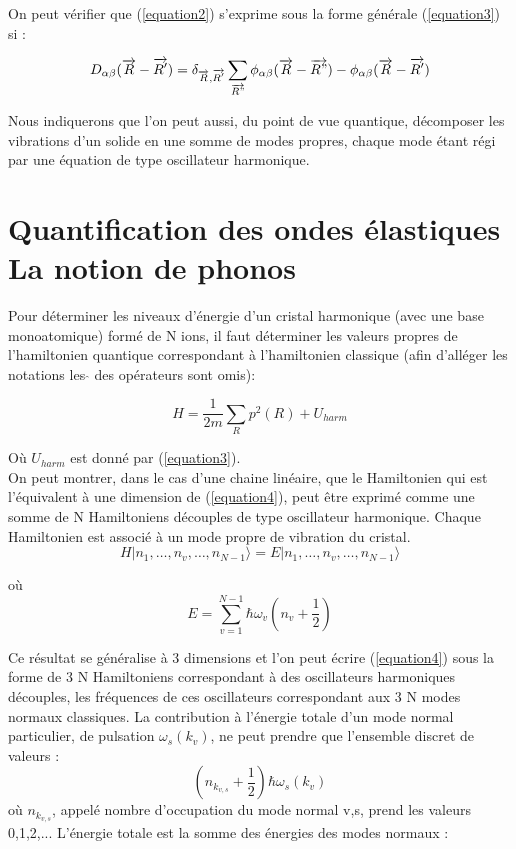 \documentclass[12pt,a4paper]{book}
\begin{document}
On peut vérifier que (\ref{equation2}) s'exprime sous la forme générale (\ref{equation3}) si :

\begin{equation}
D_{\alpha\beta} (\overrightarrow{R}-\overrightarrow{R'}) = \delta_{\overrightarrow{R},\overrightarrow{R'}} \sum_{\overrightarrow{R"}} \phi_{\alpha\beta} (\overrightarrow{R}-\overrightarrow{R"}) - \phi_{\alpha\beta} (\overrightarrow{R}-\overrightarrow{R'})
\end{equation}

Nous indiquerons que l'on peut aussi, du point de vue quantique, décomposer les vibrations d'un solide en une somme de modes propres, chaque mode étant régi par une équation de type oscillateur harmonique.

\section{Quantification des ondes élastiques La notion de phonos}

Pour déterminer les niveaux d'énergie d'un cristal harmonique (avec une base monoatomique) formé de N ions, il faut déterminer les valeurs propres de l'hamiltonien quantique correspondant à l'hamiltonien classique (afin d'alléger les notations les $\hat{}$ des opérateurs sont omis):

\begin{equation}
H = \frac{1}{2m} \sum_{R} p^{2}(R) + U_{harm} \label{equation4}
\end{equation}

Où $U_{harm}$ est donné par (\ref{equation3}).
\\

On peut montrer, dans le cas d'une chaine linéaire, que le Hamiltonien qui est l'équivalent à une dimension de (\ref{equation4}), peut être exprimé comme une somme de N Hamiltoniens découples de type oscillateur harmonique. Chaque Hamiltonien est associé à un mode propre de vibration du cristal.
\begin{equation}
H|n_{1},\ldots,n_{v},\ldots,n_{N-1}\rangle = E|n_{1},\ldots,n_{v},\ldots,n_{N-1}\rangle
\end{equation}

où
\begin{equation}
E = \sum_{v=1}^{N-1}\hbar\omega_{v}\left(n_{v}+\frac{1}{2}\right)
\end{equation}

Ce résultat se généralise à 3 dimensions et l'on peut écrire (\ref{equation4}) sous la forme de 3 N Hamiltoniens correspondant à des oscillateurs harmoniques découples, les fréquences de ces oscillateurs correspondant aux 3 N modes normaux classiques. La contribution à l'énergie totale d'un mode normal particulier, de pulsation $\omega_{s}(k_{v})$, ne peut prendre que l'ensemble discret de valeurs :
\begin{equation}
\left(n_{k_{v,s}}+\frac{1}{2}\right)\hbar\omega_{s}(k_{v})
\end{equation}
où $n_{k_{v,s}}$, appelé nombre d'occupation du mode normal v,s, prend les valeurs 0,1,2,... L'énergie totale est la somme des énergies des modes normaux :
\end{document}
